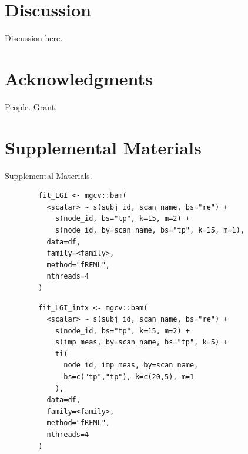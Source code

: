 \documentclass[12pt]{article}
\newcommand{\beginsupplement}{%
	\setcounter{table}{0}
	\renewcommand{\thetable}{S\arabic{table}}%
	\setcounter{figure}{0}
	\renewcommand{\thefigure}{S\arabic{figure}}%
}
\begin{document}
\section{Discussion}
\label{sec:disc}
Discussion here.



\section*{Acknowledgments}
\label{sec:ack}
People. Grant.



\pagebreak
\printbibliography
\pagebreak


\section{Supplemental Materials}
\label{sec:supp-materials}
\beginsupplement
Supplemental Materials.


\begin{equ}[H]
	\begin{lstlisting}
		fit_LGI <- mgcv::bam(
		  <scalar> ~ s(subj_id, scan_name, bs="re") +
		    s(node_id, bs="tp", k=15, m=2) +
		    s(node_id, by=scan_name, bs="tp", k=15, m=1),
		  data=df,
		  family=<family>,
		  method="fREML",
		  nthreads=4
		)
	\end{lstlisting}
	\caption{Tract scalars are modeled as a function of tract node with thin-plate regression splines using both global and group (\lstinline{scan_name}) smooths as well as individual group wiggliness. \lstinline{<scalar>} = relevant DWI metric (AD, RD, MD, or FA), \lstinline{scan_name} = session identifier factor (Base, Post, RTP), \lstinline{<family>} = relevant family and link function for scalar distribution.}
	\label{supp-code:gam-lgi}
\end{equ}


\begin{equ}[H]
	\begin{lstlisting}
		fit_LGI_intx <- mgcv::bam(
		  <scalar> ~ s(subj_id, scan_name, bs="re") +
		    s(node_id, bs="tp", k=15, m=2) +
		    s(imp_meas, by=scan_name, bs="tp", k=5) +
		    ti(
		      node_id, imp_meas, by=scan_name,
		      bs=c("tp","tp"), k=c(20,5), m=1
		    ),
		  data=df,
		  family=<family>,
		  method="fREML",
		  nthreads=4
		)
	\end{lstlisting}
	\caption{Tract scalars are modeled as a function of separate 1D node and ImPACT smooths as well as a 2D tensor product interaction surface. \lstinline{imp_meas} = ImPACT composite or total symptom measure.}
	\label{supp-code:gam-lgi-intx}
\end{equ}
\end{document}
